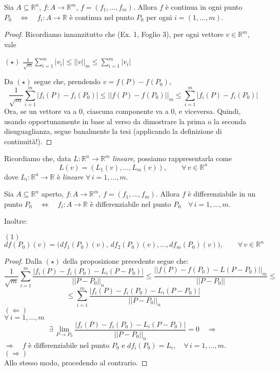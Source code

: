 \begin{proposition}
Sia $A \subseteq \mathbb{R}^n$, $f: A \longrightarrow \mathbb{R}^m$, $f=(f_1,\ldots,f_m)$. Allora $f$ è continua in ogni punto $P_0 \quad \Longleftrightarrow \quad f_i : A \longrightarrow \mathbb{R}$ è continua nel punto $P_0$ per ogni $i=(1,\ldots,m)$.
\end{proposition}
\begin{proof}
Ricordiamo innanzitutto che (Ex. 1, Foglio 3), per ogni vettore $v \in \mathbb{R}^m$, vale
\begin{center}
$\mathrm{(\star)}$
\hfill
$\displaystyle \frac{1}{\sqrt{m}} \sum_{i=1}^m|v_i| \leq ||v||_m \leq \sum_{i=1}^m|v_i|$
\hfill \null \\
\end{center}
Da $(\star)$ segue che, prendendo $v=f(P)-f(P_0)$,
$$
\frac{1}{\sqrt{m}} \sum_{i=1}^m|f_i(P)-f_i(P_0)| \leq ||f(P)-f(P_0)||_m \leq \sum_{i=1}^m|f_i(P)-f_i(P_0)|
$$
Ora, se un vettore va a $0$, ciascuna componente va a $0$, e viceversa. Quindi, usando opportunamente in base al verso da dimostrare la prima o la seconda disuguaglianza, segue banalmente la tesi (applicando la definizione di continuità!).
\end{proof}

Ricordiamo che, data $L: \mathbb{R}^n \longrightarrow \mathbb{R}^m$ \emph{lineare}, possiamo rappresentarla come
$$
L(v) = (L_1(v),\ldots,L_m(v)), \qquad \forall \, v \in \mathbb{R}^n
$$
dove $L_i: \mathbb{R}^n \longrightarrow \mathbb{R}$ è \emph{lineare} $\forall \, i=1,\ldots,m$.

\begin{proposition}
Sia $A \subseteq \mathbb{R}^n$ aperto, $f: A \longrightarrow \mathbb{R}^m$, $f=(f_1,\ldots,f_m)$. Allora $f$ è differenziabile in un punto $P_0 \quad \Longleftrightarrow \quad f_i : A \longrightarrow \mathbb{R}$ è differenziabile nel punto $P_0 \quad \forall \, i=1,\ldots,m$.

Inoltre:
\begin{center}
$\mathrm{(1)}$
\hfill
$\displaystyle df(P_0)(v) = \Big( df_1(P_0)(v),\,df_2(P_0)(v),\ldots,df_m(P_0)(v) \Big), \qquad \forall \, v \in \mathbb{R}^n$
\hfill \null \\
\end{center}
\end{proposition}
\begin{proof}
Dalla $(\star)$ della proposizione precedente segue che:
$$
\frac{1}{\sqrt{m}} \sum_{i=1}^m \frac{|f_i(P)-f_i(P_0)-L_i(P-P_0)|}{||P-P_0||_n} \leq \frac{||f(P)-f(P_0)-L(P-P_0)||_m}{||P-P_0||} \leq
$$
$$
\leq \sum_{i=1}^m \frac{|f_i(P)-f_i(P_0)-L_i(P-P_0)|}{||P-P_0||_n}
$$
$(\Leftarrow)$\\
$\forall\, i=1,\ldots,m$
$$
\exists \, \lim_{P \rightarrow P_0} \frac{|f_i(P)-f_i(P_0)-L_i(P-P_0)|}{||P-P_0||_n} = 0 \quad \Longrightarrow 
$$
$\Longrightarrow \quad f$ è differenziabile nel punto $P_0$ e $df_i(P_0) = L_i, \quad \forall \, i=1,\ldots,m$.\\
$(\Rightarrow)$\\
Allo stesso modo, procedendo al contrario.
\end{proof}

